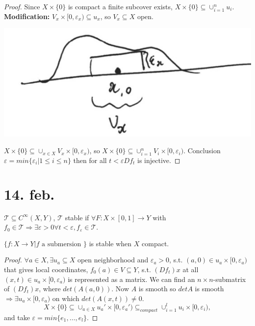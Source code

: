 \begin{proof}
     Since $X \times \{0\}$ is compact a finite subcover exists, $X \times \{0\} \subseteq \cup_{i=1}^{n}u_i$.
     \newline \textbf{Modification:}
     $V_x \times [0, \varepsilon_x) \subseteq u_x$, so $V_x \subseteq X$ open.
        \begin{center}
          \includegraphics[width=0.30\paperwidth]{difftop/week06/illustr}
        \end{center}
      $X\times \{0\} \subseteq \cup_{x\in X} V_x \times [0, \varepsilon_x)$, so $X \times \{0\} \subseteq \cup_{i=1}^n V_i \times[0, \varepsilon_i)$. Conclusion $ \varepsilon = min\{\varepsilon_i | 1 \leq i \leq n \}$ then for all $t<\varepsilon Df_t$ is injective. \qedhere
\end{proof}


\section{14. feb.}
\begin{recall}
  $\mathcal{T} \subseteq C^{\infty}(X,Y)$, $\mathcal{T}$ stable if $\forall F: X \times [0,1 ] \to Y$ with $f_0 \in \mathcal{T} \Rightarrow \exists \varepsilon >0 \forall t <\varepsilon , f_{\varepsilon} \in \mathcal{T}$.
\end{recall}
$\{f: X\to Y | f \text{ a submersion }\}$ is stable when $X$ compact.
\begin{proof}
  $\forall a \in X, \exists u_{a} \subseteq X$ open neighborhood and $\varepsilon_{a}>0$, s.t. $(a,0)\in u_a \times [0, \varepsilon_a)$ that gives local coordinates, $f_0(a)\in V\subseteq Y$, s.t. $(Df_t)x$ at all $(x,t) \in u_a \times [0, \varepsilon_a)$ is represented as a matrix.
  \newline We can find an $n\times n$-submatrix of $(Df_t)x$, where $det(A(a,0))$. Now $A$ is smooth so $detA$ is smooth $\Rightarrow\exists u_a \times [0, \varepsilon_a)$ on which $det(A(x,t))\neq 0$.
    $$X\times \{0\} \subseteq \cup_{a\in X}u_a' \times[0,\varepsilon_a') \subseteq_{compact}\cup_{i=1}^{l}u_i \times [0, \varepsilon_i),$$
  and take $\varepsilon = min\{e_1, \dots, e_l \}$.
\end{proof}
